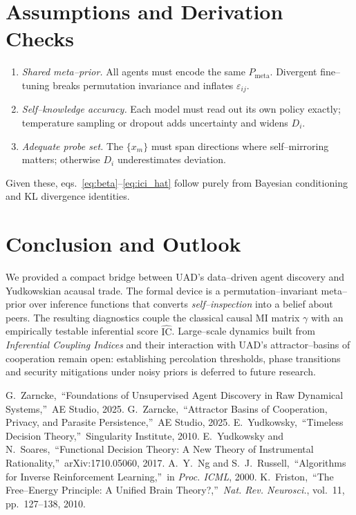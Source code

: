 \documentclass[11pt]{article}
\begin{document}
\section{Assumptions and Derivation Checks}
\begin{enumerate}
  \item \emph{Shared meta--prior.}  All agents must encode the same
    $P_{\text{meta}}$.  Divergent fine--tuning breaks permutation invariance and
    inflates $\varepsilon_{ij}$.
  \item \emph{Self--knowledge accuracy.}  Each model must read out its own
    policy exactly; temperature sampling or dropout adds uncertainty and widens
    $D_i$.
  \item \emph{Adequate probe set.}  The $\{x_m\}$ must span directions where
    self--mirroring matters; otherwise $D_i$ underestimates deviation.
\end{enumerate}

Given these, eqs.~\eqref{eq:beta}--\eqref{eq:ici_hat} follow purely from
Bayesian conditioning and KL divergence identities.

\section{Conclusion and Outlook}
We provided a compact bridge between UAD’s data--driven agent discovery and
Yudkowskian acausal trade.  The formal device is a permutation--invariant
meta--prior over inference functions that converts \emph{self--inspection} into
a belief about peers.  The resulting diagnostics couple the classical causal MI
matrix $\gamma$ with an empirically testable inferential score
$\widehat{\mathrm{IC}}$.  Large--scale dynamics built from
\emph{Inferential Coupling Indices} and their interaction with UAD’s
attractor–basins of cooperation\cite{attractor2025} remain open: establishing
percolation thresholds, phase transitions and security mitigations under noisy
priors is deferred to future research.


\begin{thebibliography}{10}
G.~Zarncke,\ ``Foundations of Unsupervised Agent Discovery in Raw Dynamical Systems,''\ AE Studio, 2025.
G.~Zarncke,\ ``Attractor Basins of Cooperation, Privacy, and Parasite Persistence,''\ AE Studio, 2025.
E.~Yudkowsky,\ ``Timeless Decision Theory,''\ Singularity Institute, 2010.
E.~Yudkowsky and N.~Soares,\ ``Functional Decision Theory: A New Theory of Instrumental Rationality,''\ arXiv:1710.05060, 2017.
A.~Y.~Ng and S.~J.~Russell,\ ``Algorithms for Inverse Reinforcement Learning,''\ in \emph{Proc. ICML}, 2000.
K.~Friston,\ ``The Free--Energy Principle: A Unified Brain Theory?,''\ \emph{Nat. Rev. Neurosci.}, vol.~11, pp.~127--138, 2010.
\end{thebibliography}
\end{document}
